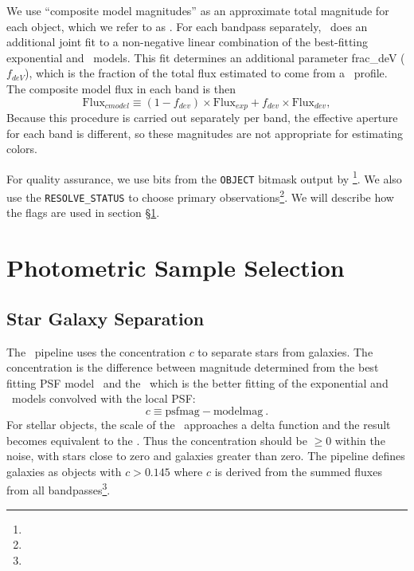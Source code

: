 \documentclass[preprint]{aastex}
\begin{document}
We use ``composite model magnitudes'' as an approximate total magnitude for
each object, which we refer to as \cmodelmag.  For each bandpass
separately, \photo\ does an additional joint fit to a non-negative
linear combination of the  best-fitting exponential and \devauc\
models. This fit determines an additional parameter {\sc frac\_deV}
($f_{deV}$), which is the fraction of the total flux estimated to come
from a \devauc\ profile.  The composite model flux in each band is then 
\begin{equation}
\textrm{Flux}_{cmodel} \equiv (1-f_{dev})\times \textrm{Flux}_{exp} + f_{dev} \times \textrm{Flux}_{dev},
\end{equation}
Because this procedure is carried out separately per band, the effective aperture for each band is
different, so these magnitudes are not appropriate for estimating colors.

For quality assurance, we use bits from the \texttt{OBJECT} bitmask output by
\photo \footnote{\DRateflags}.    We also use the \texttt{RESOLVE\_STATUS} to
choose primary observations\footnote{\DRateresolve}.  We will describe how the
flags are used in section \S \ref{sec:select}.

    

\section{Photometric Sample Selection} \label{sec:select}

\subsection{Star Galaxy Separation} \label{sec:sg}

The \photo\ pipeline uses the concentration $c$ to separate stars from
galaxies.  The concentration is the difference between magnitude determined
from the best fitting PSF model \psfmag\ and the \modelmag\, which is
the better fitting of the exponential and \devauc\ models convolved
with the local PSF:
\begin{equation}
c \equiv \textrm{psfmag} - \textrm{modelmag}~.
\end{equation}
For stellar objects, the scale of the \modelmag\ approaches a delta function and
the result becomes equivalent to the \psfmag.  Thus the concentration should be
$\ge 0$ within the noise, with stars close to zero and galaxies greater than
zero.  The pipeline defines galaxies as objects with $c > 0.145$ where $c$ is
derived from the summed fluxes from all bandpasses\footnote{\DRateclass}.  
\end{document}
